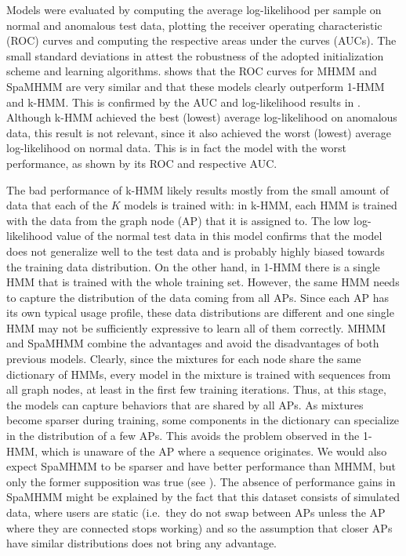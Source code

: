 Models were evaluated by computing the average log-likelihood per sample on normal and anomalous test data, plotting the receiver operating characteristic (ROC) curves and computing the respective areas under the curves (AUCs). The small standard deviations in  attest the robustness of the adopted initialization scheme and learning algorithms.  shows that the ROC curves for MHMM and SpaMHMM are very similar and that these models clearly outperform 1-HMM and k-HMM. This is confirmed by the AUC and log-likelihood results in . Although k-HMM achieved the best (lowest) average log-likelihood on anomalous data, this result is not relevant, since it also achieved the worst (lowest) average log-likelihood on normal data. This is in fact the model with the worst performance, as shown by its ROC and respective AUC.

The bad performance of k-HMM likely results mostly from the small amount of data that each of the $K$ models is trained with: in k-HMM, each HMM is trained with the data from the graph node (AP) that it is assigned to. The low log-likelihood value of the normal test data in this model confirms that the model does not generalize well to the test data and is probably highly biased towards the training data distribution. On the other hand, in 1-HMM there is a single HMM that is trained with the whole training set. However, the same HMM needs to capture the distribution of the data coming from all APs. Since each AP has its own typical usage profile, these data distributions are different and one single HMM may not be sufficiently expressive to learn all of them correctly. MHMM and SpaMHMM combine the advantages and avoid the disadvantages of both previous models. Clearly, since the mixtures for each node share the same dictionary of HMMs, every model in the mixture is trained with sequences from all graph nodes, at least in the first few training iterations. Thus, at this stage, the models can capture behaviors that are shared by all APs. As mixtures become sparser during training, some components in the dictionary can specialize in the distribution of a few APs. This avoids the problem observed in the 1-HMM, which is unaware of the AP where a sequence originates. We would also expect SpaMHMM to be sparser and have better performance than MHMM, but only the former supposition was true (see ). The absence of performance gains in SpaMHMM might be explained by the fact that this dataset consists of simulated data, where users are static (i.e.\ they do not swap between APs unless the AP where they are connected stops working) and so the assumption that closer APs have similar distributions does not bring any advantage.

